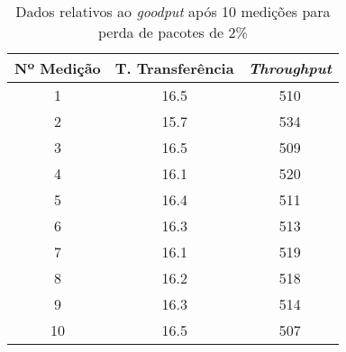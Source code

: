 \begin{table}[!ht]
\centering

\begin{tabular}{c c c}
\toprule
\toprule
	Nº Medição & T. Transferência & \emph{Throughput} \\ 
\midrule
1 & 16.5 & 510\\
2 & 15.7 & 534\\
3 & 16.5 & 509\\
4 & 16.1 & 520\\
5 & 16.4 & 511\\
6 & 16.3 & 513\\
7 & 16.1 & 519\\
8 & 16.2 & 518\\
9 & 16.3 & 514\\
10 & 16.5 & 507\\
\bottomrule
\end{tabular}
\caption{Dados relativos ao \emph{goodput} após 10 medições para perda de pacotes de 2\%}
\label{tab:loss2}
\end{table}
